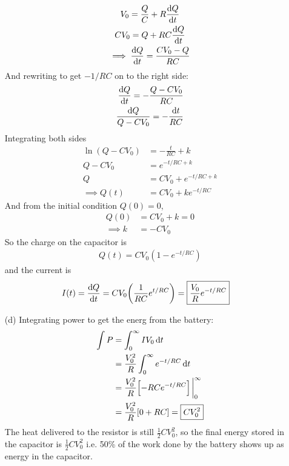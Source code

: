 \documentclass[../main.tex]{subfiles}
\begin{document}
\begin{itemize}
    \begin{gather*}
        V_0 = \frac{Q}{C} + R \dv{Q}{t} \\
        CV_0 = Q + RC \dv{Q}{t} \\
        \implies \dv{Q}{t} = \frac{C V_0 - Q}{R C} \\
    \end{gather*}
    And rewriting to get $-1/RC$ on to the right side:
    \begin{align*}
        \dv{Q}{t} = -\frac{Q - C V_0}{RC} \\
        \frac{\dd{Q}}{Q - C V_0} = -\frac{\dd{t}}{RC} \\
    \end{align*}
    Integrating both sides
    \begin{align*}
        \ln(Q - C V_0) &= -\frac{t}{RC} + k \\
        Q - C V_0 &= e^{-t/RC + k} \\
        Q &= C V_0 + e^{-t/RC + k} \\
        \implies Q(t) &= C V_0 + ke^{-t/RC}
    \end{align*}
    And from the initial condition $Q(0) = 0$,
    \begin{align*}
        Q(0) &= C V_0 + k = 0 \\
        \implies k &= -C V_0
    \end{align*}
    So the charge on the capacitor is
    \begin{align*}
        \boxed{Q(t) = C V_0 (1 - e^{-t/RC})}
    \end{align*}
    and the current is
    \begin{align*}
        I(t) &= \dv{Q}{t} = CV_0 \qt(\frac{1}{RC} e^{t/RC}) = \boxed{
            \frac{V_0}{R} e^{-t/RC} 
        }
    \end{align*}
    \item [(d)] Integrating power to get the energ from the battery:
    \begin{align*}
        \int P &= \int_0^\infty IV_0 \dd{t} \\
        &= \frac{V_0^2}{R} \int_0^\infty e^{-t/RC} \dd{t} \\
        &= \frac{V_0^2}{R} \qt[
            -RC e^{-t/RC}
        ]\eval_0^\infty \\
        &= \frac{V_0^2}{R} \qt[
            0 + RC
        ]= \boxed{CV_0^2}
    \end{align*}
    The heat delivered to the resistor is still $\boxed{\frac{1}{2} CV_0^2}$, so the final energy
    stored in the capacitor is $\boxed{\frac{1}{2} CV_0^2}$ i.e. 50\% of the work done by the
    battery shows up as energy in the capacitor.
\end{itemize}
\end{document}
